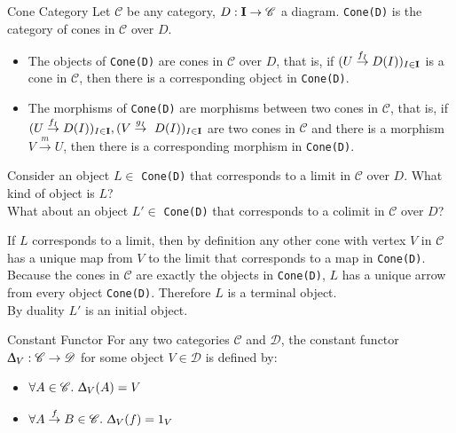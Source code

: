 \begin{definition}
  {Cone Category}
  Let $\mathscr{C}$ be any category, $D : \bf{I} \to \mathscr{C}$ a diagram.
  \texttt{Cone(D)} is the category of cones in $\mathscr{C}$ over $D$.
  \begin{itemize}
  \item The objects of \texttt{Cone(D)} are cones in $\mathscr{C}$ over $D$, that is, if
    $(U \overset{f_I}{\to} D(I))_{I \in \bf{I}}$ is a cone in $\mathscr{C}$, then there is a corresponding object
    in \texttt{Cone(D)}.
  \item The morphisms of \texttt{Cone(D)} are morphisms between two cones in $\mathscr{C}$, that is,
    if $(U \overset{f_I}{\to} D(I))_{I \in \bf{I}}, (V \overset{g_I}{\to}~ D(I))_{I \in \bf{I}}$
    are two cones in $\mathscr{C}$ and there is a morphism $V \overset{m}{\to} U$, then there
    is a corresponding morphism in \texttt{Cone(D)}.
  \end{itemize}
\end{definition}

\begin{exercise}
  Consider an object $L \in$ \texttt{Cone(D)} that corresponds to a limit in $\mathscr{C}$ over $D$.
  What kind of object is $L$?\\
  What about an object $L' \in$ \texttt{Cone(D)} that corresponds to a colimit in $\mathscr{C}$ over $D$?
\end{exercise}
\begin{answer}
  If $L$ corresponds to a limit, then by definition any other cone with vertex $V$ in $\mathscr{C}$ has a unique map
  from $V$ to the limit that corresponds to a map in \texttt{Cone(D)}.
  Because the cones in $\mathscr{C}$ are exactly the objects in \texttt{Cone(D)},
  $L$ has a unique arrow from every object \texttt{Cone(D)}.
  Therefore $L$ is a terminal object.\\
  By duality $L'$ is an initial object.
\end{answer}

\begin{definition}
  {Constant Functor}
  For any two categories $\mathscr{C}$ and $\mathscr{D}$,
  the constant functor $\Updelta _ V : \mathscr{C} \to \mathscr{D} $ for some object $V \in \mathscr{D}$
  is defined by:
  \begin{itemize}
    \item $\forall A \in \mathscr{C}. \ \Updelta _ V (A) = V$
    \item $\forall A \overset{f}{\to} B \in \mathscr{C}. \ \Updelta _ V (f) = 1_V$
  \end{itemize}
  
\end{definition}


